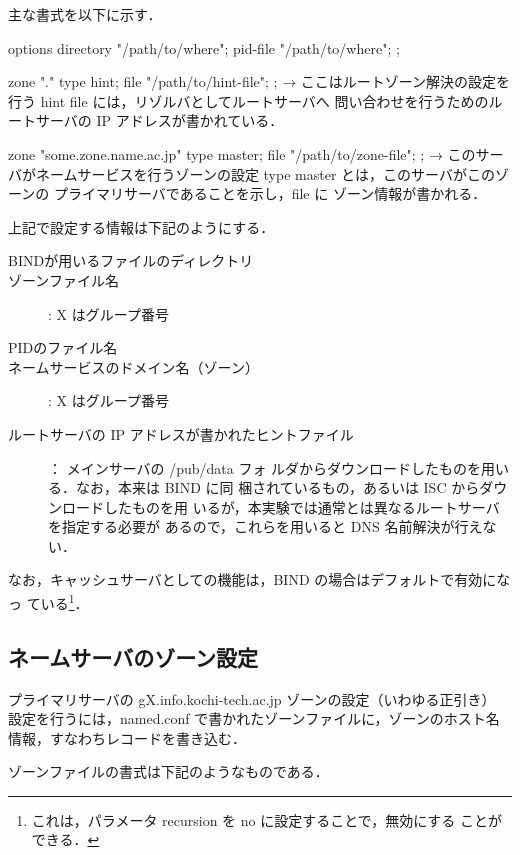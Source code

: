 主な書式を以下に示す．

\begin{cli}
options {
        directory       "/path/to/where";
        pid-file        "/path/to/where";
};

zone "." { type hint; file "/path/to/hint-file"; };
  → ここはルートゾーン解決の設定を行う
     hint file には，リゾルバとしてルートサーバへ
     問い合わせを行うためのルートサーバの
     IP アドレスが書かれている．

zone "some.zone.name.ac.jp" {
        type    master;
        file    "/path/to/zone-file";
};
  → このサーバがネームサービスを行うゾーンの設定
     type master とは，このサーバがこのゾーンの
     プライマリサーバであることを示し，file に
     ゾーン情報が書かれる．
\end{cli}

上記で設定する情報は下記のようにする．
\begin{description}
 \item[BINDが用いるファイルのディレクトリ] 
 \item[ゾーンファイル名]  : X はグループ番号
 \item[PIDのファイル名] 
 \item[ネームサービスのドメイン名（ゾーン）]
	     : X はグループ番号
 \item[ルートサーバの IP アドレスが書かれたヒントファイル]
	     ： メインサーバの /pub/data フォ
	    ルダからダウンロードしたものを用いる．なお，本来は BIND に同
	    梱されているもの，あるいは ISC からダウンロードしたものを用
	    いるが，本実験では通常とは異なるルートサーバを指定する必要が
	    あるので，これらを用いると DNS 名前解決が行えない．
\end{description}

なお，キャッシュサーバとしての機能は，BIND の場合はデフォルトで有効になっ
ている\footnote{これは，パラメータ recursion を no に設定することで，無効にする
ことができる．}．

\subsection{ネームサーバのゾーン設定}

プライマリサーバの gX.info.kochi-tech.ac.jp ゾーンの設定（いわゆる正引き）
設定を行うには，named.conf で書かれたゾーンファイルに，ゾーンのホスト名
情報，すなわちレコードを書き込む．

ゾーンファイルの書式は下記のようなものである．

